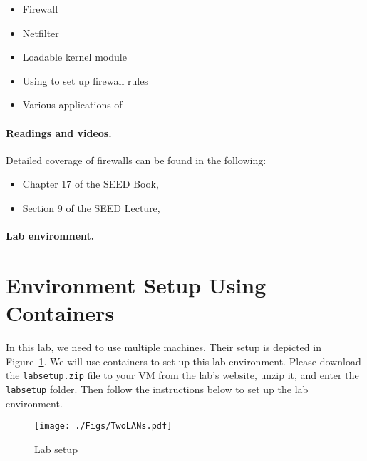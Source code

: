 \begin{itemize}[noitemsep]
\item Firewall
\item Netfilter
\item Loadable kernel module
\item Using \iptables to set up firewall rules
\item Various applications of \iptables
\end{itemize}


\paragraph{Readings and videos.}
Detailed coverage of firewalls can be found in the following:

\begin{itemize}
\item Chapter 17 of the SEED Book, \seedbook
\item Section 9 of the SEED Lecture, \seedisvideo
\end{itemize}


\paragraph{Lab environment.} \seedenvironmentB




\section{Environment Setup Using Containers}


In this lab, we need to use multiple machines. 
Their setup is depicted in Figure~\ref{fig:labsetup}.  
We will use containers to set up this lab environment.
Please download the 
\texttt{labsetup.zip} file to your VM from the lab's website,
unzip it, and enter the \texttt{labsetup} folder. 
Then follow the instructions below
to set up the lab environment.


\begin{figure}[htb]
\begin{center}
\texttt{[image: ./Figs/TwoLANs.pdf]}
\end{center}
\caption{Lab setup}
\label{fig:labsetup}
\end{figure}


